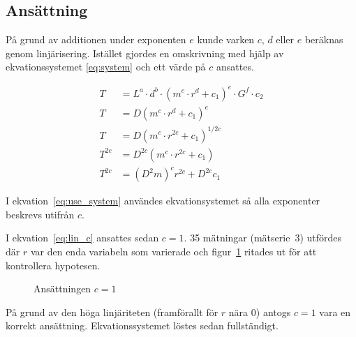 \documentclass[a4paper,12pt]{article}
\begin{document}
\subsection{Ansättning}

På grund av additionen under exponenten $e$ kunde varken $c$, $d$ eller $e$
beräknas genom linjärisering. Istället gjordes en omskrivning med hjälp av
ekvationssystemet \eqref{eq:system} och ett värde på $c$ ansattes.

\begin{align}
  T &= L^a \cdot d^b \cdot (m^c \cdot r^d + c_1)^e \cdot G^f  \cdot c_2\nonumber \\
  T &= D (m^c \cdot r^d + c_1)^e \nonumber \\
  T &= D (m^c \cdot r^{2c} + c_1)^{1/2c} \label{eq:use_system} \\
  T^{2c} &= D^{2c} (m^c \cdot r^{2c} + c_1) \nonumber \\
  T^{2c} &= (D^2m)^c r^{2c} + D^{2c}c_1 \label{eq:lin_c}
\end{align}

I ekvation~\eqref{eq:use_system} användes ekvationsystemet så alla exponenter
beskrevs utifrån $c$.

I ekvation~\eqref{eq:lin_c} ansattes sedan $c = 1$. 35 mätningar (mätserie~3)
utfördes där $r$ var den enda variabeln som varierade och figur~\ref{fig:lin_c}
ritades ut för att kontrollera hypotesen.

\begin{figure}[h!]
  \caption{Ansättningen $c = 1$}
  \label{fig:lin_c}
\end{figure}

På grund av den höga linjäriteten (framförallt för $r$ nära 0) antogs $c = 1$
vara en korrekt ansättning. Ekvationssystemet löstes sedan fullständigt.
\end{document}
